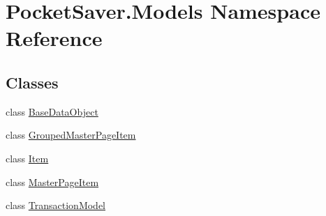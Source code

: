 \hypertarget{namespace_pocket_saver_1_1_models}{}\section{Pocket\+Saver.\+Models Namespace Reference}
\label{namespace_pocket_saver_1_1_models}
\subsection*{Classes}
\begin{DoxyCompactItemize}
\item 
class \hyperlink{class_pocket_saver_1_1_models_1_1_base_data_object}{Base\+Data\+Object}
\item 
class \hyperlink{class_pocket_saver_1_1_models_1_1_grouped_master_page_item}{Grouped\+Master\+Page\+Item}
\item 
class \hyperlink{class_pocket_saver_1_1_models_1_1_item}{Item}
\item 
class \hyperlink{class_pocket_saver_1_1_models_1_1_master_page_item}{Master\+Page\+Item}
\item 
class \hyperlink{class_pocket_saver_1_1_models_1_1_transaction_model}{Transaction\+Model}
\end{DoxyCompactItemize}
